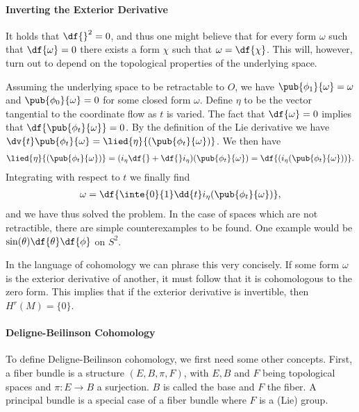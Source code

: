 \paragraph{Inverting the Exterior Derivative}
It holds that $\df{}^{2} = 0$, and thus one might believe that for every form $\omega$ such that $\df{\omega} = 0$ there exists a form $\chi$ such that $\omega = \df{\chi}$. This will, however, turn out to depend on the topological properties of the underlying space.

Assuming the underlying space to be retractable to $O$, we have $\pub{\phi_{1}}{\omega} = \omega$ and $\pub{\phi_{0}}{\omega} = 0$ for some closed form $\omega$. Define $\eta$ to be the vector tangential to the coordinate flow as $t$ is varied. The fact that $\df{\omega} = 0$ implies that $\df{\pub{\phi_{t}}{\omega}} = 0$. By the definition of the Lie derivative we have $\dv{t}\pub{\phi_{t}}{\omega} = \lied{\eta}{(\pub{\phi_{t}}{\omega})}$. We then have
\begin{align*}
	\lied{\eta}{(\pub{\phi_{t}}{\omega})} = (i_{\eta}\df{} + \df{}i_{\eta})(\pub{\phi_{t}}{\omega}) = \df{(i_{\eta}(\pub{\phi_{t}}{\omega}))}.
\end{align*}
Integrating with respect to $t$ we finally find
\begin{align*}
	\omega = \df{\inte{0}{1}\dd{t}i_{\eta}(\pub{\phi_{t}}{\omega})},
\end{align*}
and we have thus solved the problem. In the case of spaces which are not retractible, there are simple counterexamples to be found. One example would be $\sin(\theta)\df{\theta}\df{\phi}$ on $S^{2}$.

In the language of cohomology we can phrase this very concisely. If some form $\omega$ is the exterior derivative of another, it must follow that it is cohomologous to the zero form. This implies that if the exterior derivative is invertible, then $H^{r}(M) = \{0\}$.

\paragraph{Deligne-Beilinson Cohomology}
To define Deligne-Beilinson cohomology, we first need some other concepts. First, a fiber bundle is a structure $(E, B, \pi, F)$, with $E, B$ and $F$ being topological spaces and $\pi: E\to B$ a surjection. $B$ is called the base and $F$ the fiber. A principal bundle is a special case of a fiber bundle where $F$ is a (Lie) group.

